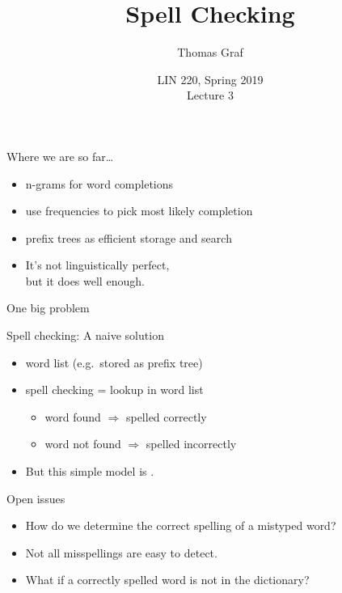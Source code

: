\documentclass[professionalfonts, xcolor={usenames,svgnames,x11names,table}]{beamer}
\title{Spell Checking}
\author{Thomas Graf}
\institute{Stony Brook University\\\texttt{lin220@thomasgraf.net}}
\date{LIN 220, Spring 2019\\Lecture 3}
\begin{document}
\unnumbered{
\begin{frame}
	\titlepage
\end{frame}
}

\begin{frame}{Where we are so far\ldots}
    \begin{itemize}
        \item n-grams for word completions
        \item use frequencies to pick most likely completion
        \item prefix trees as efficient storage and search
        \item It's not linguistically perfect,\\
              but it does well enough.
    \end{itemize}

    \begin{block}{One big problem}
    \end{block}
\end{frame}

\begin{frame}{Spell checking: A naive solution}
    \begin{itemize}
        \item word list (e.g.~stored as prefix tree)
        \item spell checking = lookup in word list
            \begin{itemize}
                \item word found $\Rightarrow$ spelled correctly
                \item word not found $\Rightarrow$ spelled incorrectly
            \end{itemize}
        \item But this simple model is .
    \end{itemize}

    \pause
    \begin{block}{Open issues}
        \begin{itemize}
            \item How do we determine the correct spelling of a mistyped word?
            \item Not all misspellings are easy to detect.
            \item What if a correctly spelled word is not in the dictionary?\\
        \end{itemize}
    \end{block}
\end{frame}
\end{document}
